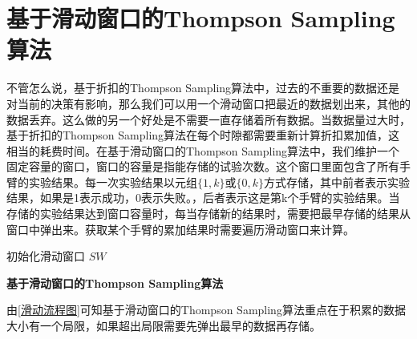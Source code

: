 \section{基于滑动窗口的Thompson Sampling算法}
不管怎么说，基于折扣的Thompson Sampling算法中，过去的不重要的数据还是对当前的决策有影响，那么我们可以用一个滑动窗口把最近的数据划出来，其他的数据丢弃。这么做的另一个好处是不需要一直存储着所有数据。当数据量过大时，基于折扣的Thompson Sampling算法在每个时隙都需要重新计算折扣累加值，这相当的耗费时间。在基于滑动窗口的Thompson Sampling算法中，我们维护一个固定容量的窗口，窗口的容量是指能存储的试验次数。这个窗口里面包含了所有手臂的实验结果。每一次实验结果以元组$\{1,k\}$或$\{0,k\}$方式存储，其中前者表示实验结果，如果是1表示成功，0表示失败。，后者表示这是第k个手臂的实验结果。当存储的实验结果达到窗口容量时，每当存储新的结果时，需要把最早存储的结果从窗口中弹出来。获取某个手臂的累加结果时需要遍历滑动窗口来计算。
\begin{algorithm}[h]
	初始化滑动窗口 $SW$
	
	\caption{\textbf{基于滑动窗口的Thompson Sampling算法}}
	\label{sgd}
\end{algorithm}

由\ref{滑动流程图}可知基于滑动窗口的Thompson Sampling算法重点在于积累的数据大小有一个局限，如果超出局限需要先弹出最早的数据再存储。


